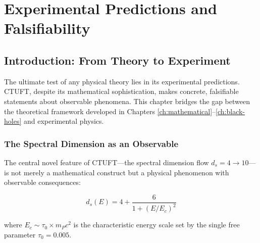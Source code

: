 \chapter{Experimental Predictions and Falsifiability}
\label{ch:experimental}

\begin{abstract}
This chapter presents concrete, experimentally testable predictions of the Clifford-Torsion Unified Field Theory (CTUFT). We focus on primordial black hole (PBH) Hawking radiation as a probe of the theory's spectral dimension flow $d_s \to 10$. Five specific falsifiable predictions are derived, ranging from gamma-ray spectrum modifications detectable by CTA (2025+) to gravitational wave signals observable by LISA (2030s). These predictions establish CTUFT as a physically testable framework rather than a purely theoretical construct.
\end{abstract}

\section{Introduction: From Theory to Experiment}
\label{sec:exp-intro}

The ultimate test of any physical theory lies in its experimental predictions. CTUFT, despite its mathematical sophistication, makes concrete, falsifiable statements about observable phenomena. This chapter bridges the gap between the theoretical framework developed in Chapters \ref{ch:mathematical}--\ref{ch:black-holes} and experimental physics.

\subsection{The Spectral Dimension as an Observable}
\label{subsec:spectral-observable}

The central novel feature of CTUFT—the spectral dimension flow $d_s = 4 \to 10$—is not merely a mathematical construct but a physical phenomenon with observable consequences:

\begin{equation}
d_s(E) = 4 + \frac{6}{1 + (E/E_c)^2}
\label{eq:spectral-flow-exp}
\end{equation}

where $E_c \sim \tau_0 \times m_P c^2$ is the characteristic energy scale set by the single free parameter $\tau_0 = 0.005$.

